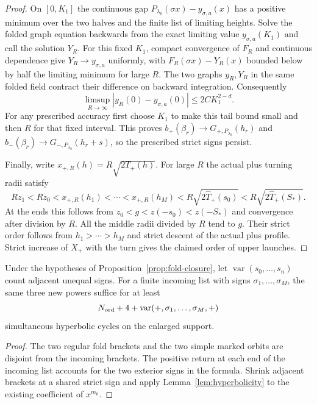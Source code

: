 \begin{proof}
On $[0,K_1]$ the continuous gap
$P_{\lambda_0}(\sigma x)-y_{\sigma,a}(x)$ has a positive minimum
over the two halves and the finite list of limiting heights.
Solve the folded graph equation backwards from the exact limiting
value $y_{\sigma,a}(K_1)$ and call the solution $Y_R$. For this fixed
$K_1$, compact convergence of $F_R$ and continuous dependence give
$Y_R\to y_{\sigma,a}$ uniformly, with $F_R(\sigma x)-Y_R(x)$ bounded
below by half the limiting minimum for large $R$. The two graphs $y_R,Y_R$ in the
same folded field contract their difference on backward integration.
Consequently
\[
 \limsup_{R\to\infty}|y_R(0)-y_{\sigma,a}(0)|\le 2C K_1^{2-d}.
\]
For any prescribed accuracy first choose $K_1$ to make this tail
bound small and then $R$ for that fixed interval. This proves
$b_+(\beta_r)\to G_{+,P_{\lambda_0}}(h_r)$ and
$b_-(\beta_r)\to G_{-,P_{\lambda_0}}(h_r+s)$, so the prescribed
strict signs persist.

Finally, write $x_{+,R}(h)=R\sqrt{2T_+(h)}$. For large $R$ the
actual plus turning radii satisfy
\[
 Rz_1<Rz_0<x_{+,R}(h_1)<\cdots<x_{+,R}(h_M)
 <R\sqrt{2\widehat T_+(s_0)}<R\sqrt{2\widehat T_+(S_*)}.
\]
At the ends this follows from $z_0<g<z(-s_0)<z(-S_*)$ and convergence
after division by $R$. All the middle radii divided by $R$ tend to
$g$. Their strict order follows from $h_1>\cdots>h_M$ and strict
descent of the actual plus profile. Strict increase of $X_+$ with
the turn gives the claimed order of upper launches.
\end{proof}

\begin{corollary}\label{cor:sign-cost}
Under the hypotheses of Proposition~\ref{prop:fold-closure}, let
$\operatorname{var}(s_0,\ldots,s_n)$ count adjacent unequal signs.
For a finite incoming list with signs $\sigma_1,\ldots,\sigma_M$, the
same three new powers suffice for at least
\[
 N_{\rm ord}+4+\operatorname{var}(+,\sigma_1,\ldots,\sigma_M,+)
\]
simultaneous hyperbolic cycles on the enlarged support.
\end{corollary}
\begin{proof}
The two regular fold brackets and the two simple marked orbits are
disjoint from the incoming brackets. The positive return at each end
of the incoming list accounts for the two exterior signs in the formula.
Shrink adjacent brackets at a shared strict sign and apply
Lemma~\ref{lem:hyperbolicity} to the existing coefficient of $x^{m_0}$.
\end{proof}
